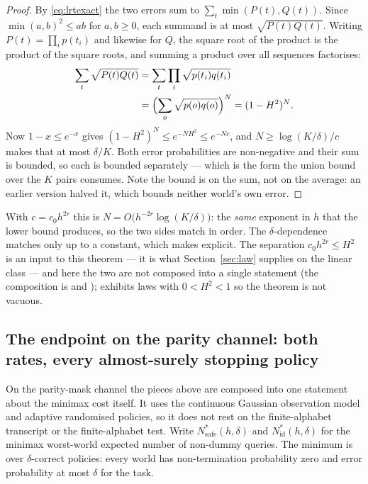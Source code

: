 \begin{proof}
By \eqref{eq:lrtexact} the two errors sum to $\sum_{t}\min(P(t),Q(t))$. Since
$\min(a,b)^{2}\le ab$ for $a,b\ge0$, each summand is at most $\sqrt{P(t)Q(t)}$. Writing
$P(t)=\prod_{i}p(t_{i})$ and likewise for $Q$, the square root of the product is the
product of the square roots, and summing a product over all sequences factorises:
\begin{align*}
\sum_{t}\sqrt{P(t)Q(t)}
&=\sum_{t}\prod_{i}\sqrt{p(t_{i})q(t_{i})}\\
&=\Bigl(\sum_{o}\sqrt{p(o)q(o)}\Bigr)^{N}
=(1-H^{2})^{N}.
\end{align*}
Now $1-x\le e^{-x}$ gives $(1-H^{2})^{N}\le e^{-NH^{2}}\le e^{-Nc}$, and
$N\ge\log(K/\delta)/c$ makes that at most $\delta/K$. Both error probabilities are
non-negative and their sum is bounded, so each is bounded separately --- which is the form
the union bound over the $K$ pairs consumes. Note the bound is on the sum, not on the
average: an earlier version halved it, which bounds neither world's own error.
\end{proof}

With $c=c_{0}h^{2r}$ this is $N=O\bigl(h^{-2r}\log(K/\delta)\bigr)$: the \emph{same}
exponent in $h$ that the lower bound produces, so the two sides match in order. The
$\delta$-dependence matches only up to a constant, which  makes
explicit. The separation $c_{0}h^{2r}\le H^{2}$ is an input to this theorem --- it is what
Section~\ref{sec:law} supplies on the linear class --- and here the two are not composed into
a single statement (the composition is  and
);  exhibits laws with $0<H^{2}<1$ so
the theorem is not vacuous.


\subsection{The endpoint on the parity channel: both rates, every almost-surely stopping policy}
\label{sec:endpoint}

On the parity-mask channel the pieces above are composed into one statement about the
minimax cost itself. It uses the continuous Gaussian observation model and adaptive
randomised policies, so it does not rest on the finite-alphabet transcript or the
finite-alphabet test. Write $N^{*}_{\mathrm{safe}}(h,\delta)$ and $N^{*}_{\mathrm{id}}(h,\delta)$
for the minimax worst-world expected number of non-dummy queries. The minimum is over
$\delta$-correct policies: every world has non-termination probability zero and error
probability at most $\delta$ for the task.

